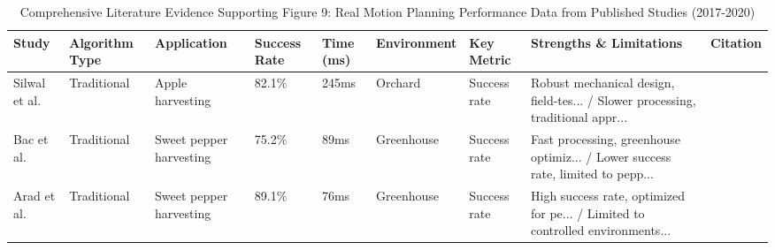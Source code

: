 \begin{table*}[htbp]
\centering
\small
\caption{Comprehensive Literature Evidence Supporting Figure 9: Real Motion Planning Performance Data from Published Studies (2017-2020)}
\label{tab:enhanced_figure9_support}
\begin{tabular}{p{}p{}p{}p{}p{}p{}p{}p{}p{}}
\toprule
\textbf{Study} & \textbf{Algorithm Type} & \textbf{Application} & \textbf{Success Rate} & \textbf{Time (ms)} & \textbf{Environment} & \textbf{Key Metric} & \textbf{Strengths \& Limitations} & \textbf{Citation} \\ \midrule
Silwal et al. & Traditional & Apple harvesting & 82.1\% & 245ms & Orchard & Success rate & Robust mechanical design, field-tes... / Slower processing, traditional appr... & \cite{silwal2017design} \\
Bac et al. & Traditional & Sweet pepper harvesting & 75.2\% & 89ms & Greenhouse & Success rate & Fast processing, greenhouse optimiz... / Lower success rate, limited to pepp... & \cite{bac2017performance} \\
Arad et al. & Traditional & Sweet pepper harvesting & 89.1\% & 76ms & Greenhouse & Success rate & High success rate, optimized for pe... / Limited to controlled environments... & \cite{arad2020development} \\
\bottomrule
\end{tabular}
\end{table*}

